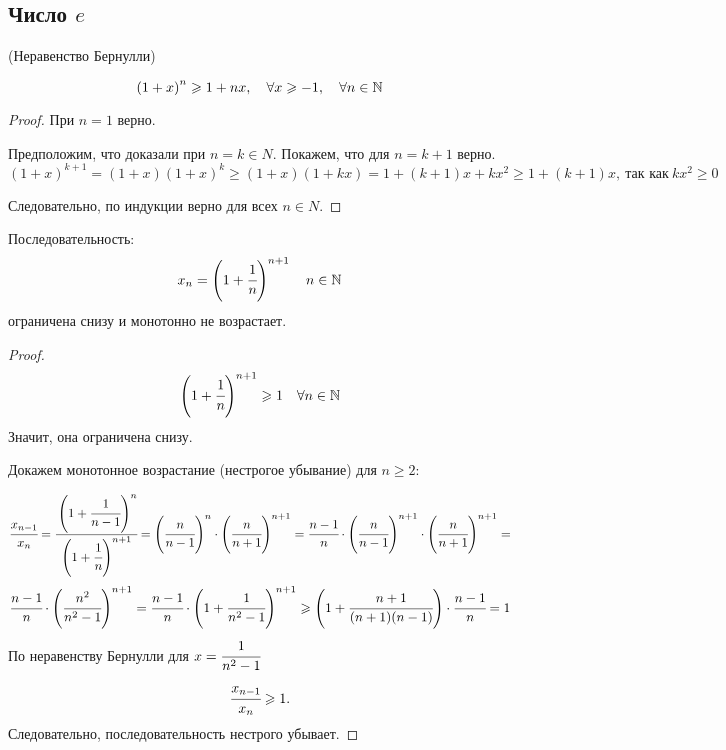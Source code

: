 \subsection{Число $e$}
\begin{lemma}
    \hypertarget{lem4.14}{(Неравенство Бернулли)}
    $$
    \left( 1 + x \right)^{n} \geq 1 + nx, \quad \forall x \geq -1, \quad \forall n \in \N
    $$
\end{lemma}
\begin{proof}
     При $n = 1$ верно.

    Предположим, что доказали при $n = k \in N.$ Покажем, что для $n = k +1$ верно.
     $$ \left( 1 + x \right)^{k+1} = \left( 1+x \right)\left(1 + x\right)^{k} \geq (1 + x)(1 + kx) = 1 + (k+1) x + kx^{2} \geq 1 + (k+1)x,\ \textrm{так как} \  kx^{2} \geq 0
     $$

     Следовательно, по индукции верно для всех $n \in N$.
\end{proof}


\begin{theorem}
    Последовательность:
    $$ x_{n} = \left( 1 + \cfrac{1}{n}\right)^{n+1} \quad n \in \N
    $$
    ограничена снизу и монотонно не возрастает.
\end{theorem}
\begin{proof}
    $$ \left( 1 +\cfrac{1}{n} \right)^{n+1} \geq 1 \quad \forall n \in \N
    $$
    Значит, она ограничена снизу.

    Докажем монотонное возрастание (нестрогое убывание) для $n \geq 2$:

    $$ \cfrac{x_{n-1}}{x_{n}} = \cfrac{\left( 1 + \cfrac{1}{n-1}\right)^{n}}{\left( 1 + \cfrac{1}{n}\right)^{n+1}} = \left(\cfrac{n}{n-1}\right)^{n} \cdot \left(\cfrac{n}{n+1} \right)^{n+1} = \cfrac{n-1}{n} \cdot \left(\cfrac{n}{n-1}\right)^{n+1} \cdot \left(\cfrac{n}{n+1} \right)^{n+1}  =
    $$ 
    $$\cfrac{n-1}{n} \cdot \left(\cfrac{n^{2}}{n^{2}-1}\right)^{n+1} = \cfrac{n-1}{n} \cdot \left( 1 + \cfrac{1}{n^{2}-1}\right)^{n+1} \geq \left(1+ \cfrac{n+1}{(n+1)(n-1)}\right) \cdot \cfrac{n-1}{n} = 1
    $$
    По неравенству Бернулли для $x = \cfrac{1}{n^2 - 1}$
    $$
    \cfrac{x_{n-1}}{x_{n}} \geq 1.
    $$
    Следовательно, последовательность нестрого убывает.
\end{proof}

